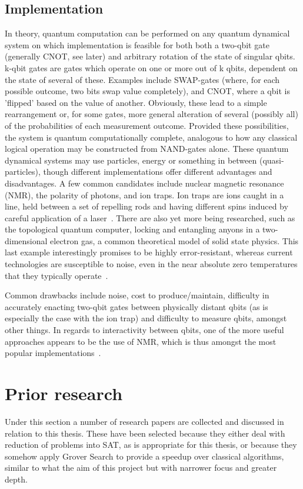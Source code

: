 \documentclass[msc,lith,english]{liuthesis}
\begin{document}
\subsection{Implementation}
In theory, quantum computation can be performed on any quantum dynamical system on which implementation is feasible for both both a two-qbit gate (generally CNOT, see later) and arbitrary rotation of the state of singular qbits. k-qbit gates are gates which operate on one or more out of k qbits, dependent on the state of several of these. Examples include SWAP-gates (where, for each possible outcome, two bits swap value completely), and CNOT, where a qbit is 'flipped' based on the value of another. Obviously, these lead to a simple rearrangement or, for some gates, more general alteration of several (possibly all) of the probabilities of each measurement outcome\cite{QCQI}. Provided these possibilities, the system is quantum computationally complete, analogous to how any classical logical operation may be constructed from NAND-gates alone. These quantum dynamical systems may use particles, energy or something in between (quasi-particles), though different implementations offer different advantages and disadvantages. A few common candidates include nuclear magnetic resonance (NMR), the polarity of photons, and ion traps. Ion traps are ions caught in a line, held between a set of repelling rods and having different spins induced by careful application of a laser~\cite{QCQI, EIQC}. There are also yet more being researched, such as the topological quantum computer, locking and entangling anyons in a two-dimensional electron gas, a common theoretical model of solid state physics. This last example interestingly promises to be highly error-resistant, whereas current technologies are susceptible to noise, even in the near absolute zero temperatures that they typically operate~\cite{EIQC}. 

Common drawbacks include noise, cost to produce/maintain, difficulty in accurately enacting two-qbit gates between physically distant qbits (as is especially the case with the ion trap) and difficulty to measure qbits, amongst other things. In regards to interactivity between qbits, one of the more useful approaches appears to be the use of NMR, which is thus amongst the most popular implementations~\cite{QCQI}.

\section{Prior research}
Under this section a number of research papers are collected and discussed in relation to this thesis. These have been selected because they either deal with reduction of problems into SAT, as is appropriate for this thesis, or because they somehow apply Grover Search to provide a speedup over classical algorithms, similar to what the aim of this project but with narrower focus and greater depth.
\end{document}
